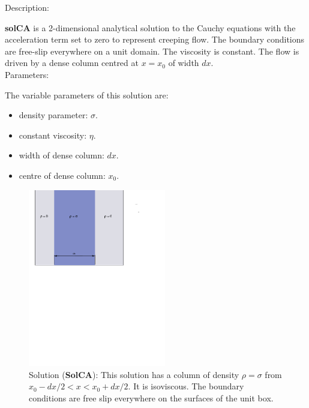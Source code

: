   {\large \fontB Description:}
  
  {\bf solCA} is a 2-dimensional analytical solution to the Cauchy equations with the acceleration term set to zero
  to represent creeping flow. The boundary conditions are free-slip everywhere on a unit domain. The viscosity is constant.
  The flow is driven by a dense column centred at $ x=x_0 $ of width $dx$.
  \\

 {\large \fontB Parameters:}
  
 The variable parameters of this solution are:
 \begin{itemize}
   \item{density parameter: $ \sigma $.}
   \item{constant viscosity: $\eta$.}
   \item{width of dense column: $dx$.}
   \item{centre of dense column: $x_0$.}

 \end{itemize}

  \begin{figure}
    \includegraphics[width=6cm,clip]{../figs/figCA.pdf}
    \caption[Short caption]{\label{figCA} 
      Solution ({\bf SolCA}):
      This solution has a column of density $\rho = \sigma$ from $x_0-dx/2 < x < x_0+dx/2$.
      It is isoviscous.
      The boundary conditions are free slip everywhere on the surfaces of the unit box.}
  \end{figure} 
  

